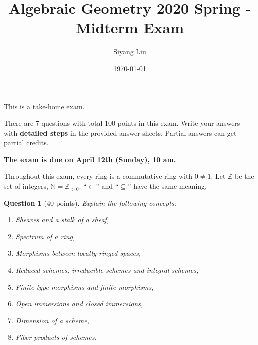 \documentclass[12pt]{amsart}
\title{Algebraic Geometry 2020 Spring - Midterm Exam}
\author{Siyang Liu}
\date{\today}
\newcommand{\Zz}{\mathbb{Z}}
\newcommand{\Nn}{\mathbb{N}}
\newtheorem{question}{Question}
\begin{document}
\maketitle


This is a take-home exam.

There are 7 questions with total 100 points in this exam. Write your answers with {\bf detailed steps} in the provided answer sheets. Partial answers can get partial credits.

{\bf The exam is due on April 12th (Sunday), 10 am.}

\medskip

Throughout this exam, every ring is a commutative ring with $0 \neq 1$. Let $\Zz$ be the set of integers, $\Nn = \Zz_{>0}$. ``$\subset$'' and ``$\subseteq$'' have the same meaning.


\bigskip


\begin{question}[$40$ points]
Explain the following concepts:
\begin{enumerate}

\item Sheaves and a stalk of a sheaf,

\item Spectrum of a ring,

\item Morphisms between locally ringed spaces,

\item Reduced schemes, irreducible schemes and integral schemes,

\item Finite type morphisms and finite morphisms,

\item Open immersions and closed immersions,

\item Dimension of a scheme,

\item Fiber products of schemes.

\end{enumerate}
\end{question}
\end{document}

